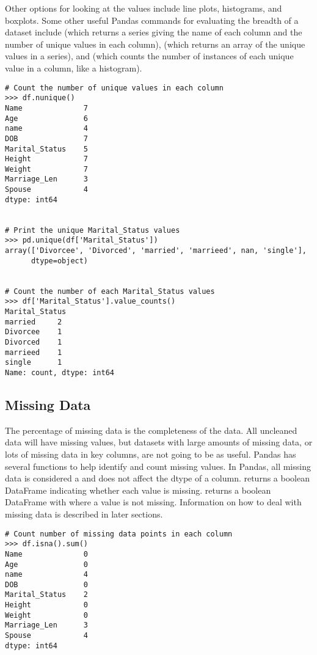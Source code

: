 Other options for looking at the values include line plots, histograms, and boxplots.
Some other useful Pandas commands for evaluating the breadth of a dataset include  (which returns a series giving the name of each column and the number of unique values in each column),  (which returns an array of the unique values in a series), and  (which counts the number of instances of each unique value in a column, like a histogram).

\begin{lstlisting}
# Count the number of unique values in each column
>>> df.nunique()
Name              7
Age               6
name              4
DOB               7
Marital_Status    5
Height            7
Weight            7
Marriage_Len      3
Spouse            4
dtype: int64


# Print the unique Marital_Status values
>>> pd.unique(df['Marital_Status'])
array(['Divorcee', 'Divorced', 'married', 'marrieed', nan, 'single'],
      dtype=object)


# Count the number of each Marital_Status values
>>> df['Marital_Status'].value_counts()
Marital_Status
married     2
Divorcee    1
Divorced    1
marrieed    1
single      1
Name: count, dtype: int64

\end{lstlisting}

\subsection*{Missing Data}
The percentage of missing data is the completeness of the data.
All uncleaned data will have missing values, but datasets with large amounts of missing data, or lots of missing data in key columns, are not going to be as useful.
Pandas has several functions to help identify and count missing values.
In Pandas, all missing data is considered a  and does not affect the dtype of a column.
 returns a boolean DataFrame indicating whether each value is missing.
 returns a boolean DataFrame with  where a value is not missing.
Information on how to deal with missing data is described in later sections.

\begin{lstlisting}
# Count number of missing data points in each column
>>> df.isna().sum()
Name              0
Age               0
name              4
DOB               0
Marital_Status    2
Height            0
Weight            0
Marriage_Len      3
Spouse            4
dtype: int64
\end{lstlisting}


